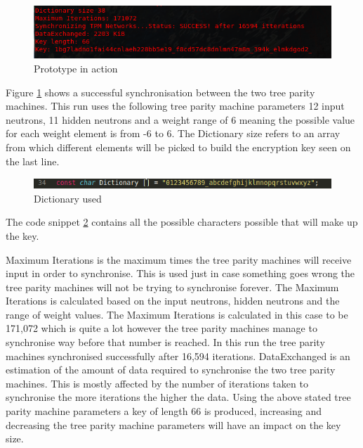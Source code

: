 \begin{figure}[!h]
  \centering
      \includegraphics[width=1\textwidth]{Figures/proto2.png}
  \caption[Prototype in action]{Prototype in action}
  \label{fig:prototype2}
\end{figure}
\FloatBarrier

\FloatBarrier
Figure \ref{fig:prototype2} shows a successful synchronisation between the two tree parity machines.
This run uses the following tree parity machine parameters 12 input neutrons, 11 hidden neutrons and a weight range of 6 meaning the possible value for each weight element is from -6 to 6.  
The Dictionary size refers to an array from which different elements will be picked to build the encryption key seen on the last line.

\begin{figure}[!h]
  \centering
      \includegraphics[width=1\textwidth]{Figures/proto4.png}
  \caption[Dictionary used]{Dictionary used}
  \label{fig:prototype4}
\end{figure}
\FloatBarrier
The code snippet \ref{fig:prototype4} contains all the possible characters possible that will make up the key. 

Maximum Iterations is the maximum times the tree parity machines will receive input in order to synchronise. This is used just in case something goes wrong the tree parity machines will not be trying to synchronise forever. The Maximum Iterations is calculated based on the input neutrons, hidden neutrons and the range of weight values. The Maximum Iterations is calculated in this case to be 171,072 which is quite a lot however the tree parity machines manage to synchronise way before that number is reached. In this run the tree parity machines synchronised successfully after 16,594 iterations. 
DataExchanged is an estimation of the amount of data required to synchronise the two tree parity machines. This is mostly affected by the number of iterations taken to synchronise the more iterations the higher the data. 
Using the above stated tree parity machine parameters a key of length 66 is produced, increasing and decreasing the tree parity machine parameters will have an impact on the key size.


